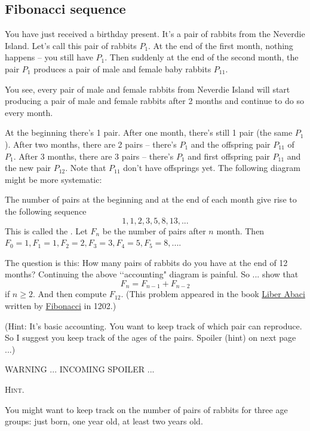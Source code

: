 \subsection{Fibonacci sequence}

You have just received a birthday present. It's a pair of rabbits from the
Neverdie Island.
Let's call this pair of rabbits $P_1$.
At the end of the first month, nothing happens -- you still have $P_1$.
Then suddenly at the end of the second month,
the pair $P_1$ produces a pair of male and
female baby rabbits $P_{11}$.

You see, every pair of male and female rabbits from Neverdie Island will
start producing
a pair of male and female rabbits after 2 months and continue to do so
every month.

At the beginning there's 1 pair.
After one month, there's still 1 pair (the same $P_1$).
After two months, there are 2 pairs -- there's $P_1$ and the offspring pair
$P_{11}$ of $P_1$.
After 3 months, there are 3 pairs -- there's $P_1$ and first offspring pair
$P_{11}$
and the new pair $P_{12}$. Note that $P_{11}$ don't have offsprings yet.
The following diagram might be more systematic:
  

      
The number of pairs at the beginning and at the end of each
month give rise to the following sequence
\[
1,1,2,3,5,8,13,...
\]
This is called the .
Let $F_n$ be the number of pairs after $n$ month.
Then $F_0 = 1, F_1 = 1, F_2 = 2, F_3 = 3, F_4 = 5, F_5 = 8, ...$.

The question is this:
How many pairs of rabbits do you have at the end of 12 months?
Continuing the above \lq\lq accounting" diagram is painful.
So ... show that
\[
F_n = F_{n - 1} + F_{n - 2}
\]
if $n \geq 2$.
And then compute $F_{12}$.
(This problem appeared in the book
\href{https://en.wikipedia.org/wiki/Liber_Abaci}{Liber Abaci}
written by \href{https://en.wikipedia.org/wiki/Fibonacci}{Fibonacci} in 1202.) 

(Hint: It's basic accounting. You want to keep track of which
pair can reproduce.
So I suggest you keep track of the ages of the pairs.
Spoiler (hint) on next page ...)

\newpage
WARNING ... INCOMING SPOILER ...

\textsc{Hint.}

You might want to keep track on the number of pairs of rabbits for
three age groups: just born, one year old, at least two years old.

